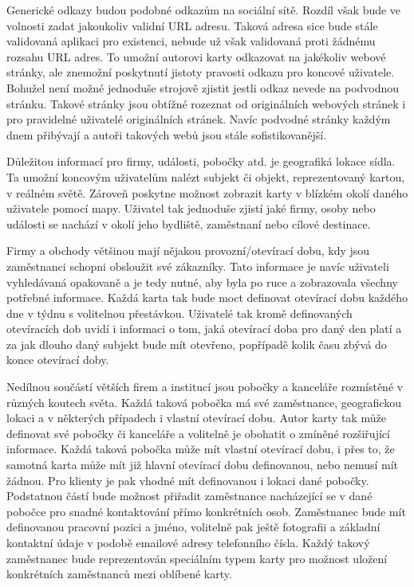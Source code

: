 	Generické odkazy budou podobné odkazům na sociální sítě.
	Rozdíl však bude ve volnosti zadat jakoukoliv validní \ac{URL} adresu.
	Taková adresa sice bude stále validovaná aplikaci pro existenci, nebude už však validovaná proti žádnému rozsahu
	\ac{URL} adres.
	To umožní autorovi karty odkazovat na jakékoliv webové stránky, ale znemožní poskytnutí jistoty pravosti odkazu
	pro koncové uživatele.
	Bohužel není možné jednoduše strojově zjistit jestli odkaz nevede na podvodnou stránku.
	Takové stránky jsou obtížné rozeznat od originálních webových stránek i pro pravidelné uživatelé originálních stránek.
	Navíc podvodné stránky každým dnem přibývají a autoři takových webů jsou stále sofistikovanější.

	Důležitou informací pro firmy, události, pobočky atd. je geografiká lokace sídla.
	Ta umožní koncovým uživatelům nalézt subjekt či objekt, reprezentovaný kartou, v reálném světě.
	Zároveň poskytne možnost zobrazit karty v blízkém okolí daného uživatele pomocí mapy.
	Uživatel tak jednoduše zjistí jaké firmy, osoby nebo události se nachází v okolí jeho bydliště, zaměstnaní nebo
	cílové destinace.

	Firmy a obchody většinou mají nějakou provozní/otevírací dobu, kdy jsou zaměstnanci schopni obsloužit své zákazníky.
	Tato informace je navíc uživateli vyhledávaná opakovaně a je tedy nutné, aby byla po ruce a zobrazovala všechny potřebné
	informace.
	Každá karta tak bude moct definovat otevírací dobu každého dne v týdnu s volitelnou přestávkou.
	Uživatelé tak kromě definovaných otevíracích dob uvidí i informaci o tom, jaká otevírací doba pro daný den platí
	a za jak dlouho daný subjekt bude mít otevřeno, popřípadě kolik času zbývá do konce otevírací doby.

	Nedílnou součástí větších firem a institucí jsou pobočky a kanceláře rozmístěné v různých koutech světa.
	Každá taková pobočka má své zaměstnance, geografickou lokaci a v některých případech i vlastní otevírací dobu.
	Autor karty tak může definovat své pobočky či kanceláře a volitelně je obohatit o zmíněné rozšiřující informace.
	Každá taková pobočka může mít vlastní otevírací dobu, i přes to, že samotná karta může mít již hlavní otevírací dobu
	definovanou, nebo nemusí mít žádnou.
	Pro klienty je pak vhodné mít definovanou i lokaci dané pobočky.
	Podstatnou částí bude možnost přiřadit zaměstnance nacházející se v dané pobočce pro snadné kontaktování přímo konkrétních
	osob.
	Zaměstnanec bude mít definovanou pracovní pozici a jméno, volitelně pak ještě fotografii a základní kontaktní údaje
	v podobě emailové adresy telefonního čísla.
	Každý takový zaměstnanec bude reprezentován speciálním typem karty pro možnost uložení konkrétních zaměstnanců mezi oblíbené
	karty.

